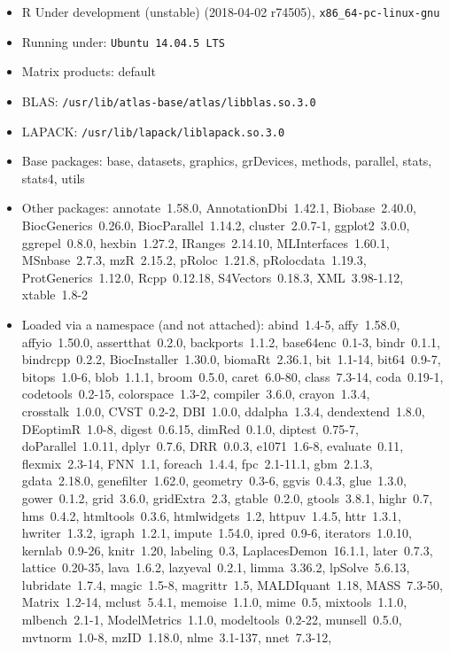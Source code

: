 \documentclass[12pt]{article}\usepackage[]{graphicx}\usepackage[]{color}
\begin{document}
\begin{appendices}
\begin{itemize}\raggedright
  \item R Under development (unstable) (2018-04-02 r74505), \verb|x86_64-pc-linux-gnu|
  \item Running under: \verb|Ubuntu 14.04.5 LTS|
  \item Matrix products: default
  \item BLAS: \verb|/usr/lib/atlas-base/atlas/libblas.so.3.0|
  \item LAPACK: \verb|/usr/lib/lapack/liblapack.so.3.0|
  \item Base packages: base, datasets, graphics, grDevices,
    methods, parallel, stats, stats4, utils
  \item Other packages: annotate~1.58.0, AnnotationDbi~1.42.1,
    Biobase~2.40.0, BiocGenerics~0.26.0, BiocParallel~1.14.2,
    cluster~2.0.7-1, ggplot2~3.0.0, ggrepel~0.8.0, hexbin~1.27.2,
    IRanges~2.14.10, MLInterfaces~1.60.1, MSnbase~2.7.3,
    mzR~2.15.2, pRoloc~1.21.8, pRolocdata~1.19.3,
    ProtGenerics~1.12.0, Rcpp~0.12.18, S4Vectors~0.18.3,
    XML~3.98-1.12, xtable~1.8-2
  \item Loaded via a namespace (and not attached): abind~1.4-5,
    affy~1.58.0, affyio~1.50.0, assertthat~0.2.0, backports~1.1.2,
    base64enc~0.1-3, bindr~0.1.1, bindrcpp~0.2.2,
    BiocInstaller~1.30.0, biomaRt~2.36.1, bit~1.1-14, bit64~0.9-7,
    bitops~1.0-6, blob~1.1.1, broom~0.5.0, caret~6.0-80,
    class~7.3-14, coda~0.19-1, codetools~0.2-15, colorspace~1.3-2,
    compiler~3.6.0, crayon~1.3.4, crosstalk~1.0.0, CVST~0.2-2,
    DBI~1.0.0, ddalpha~1.3.4, dendextend~1.8.0, DEoptimR~1.0-8,
    digest~0.6.15, dimRed~0.1.0, diptest~0.75-7,
    doParallel~1.0.11, dplyr~0.7.6, DRR~0.0.3, e1071~1.6-8,
    evaluate~0.11, flexmix~2.3-14, FNN~1.1, foreach~1.4.4,
    fpc~2.1-11.1, gbm~2.1.3, gdata~2.18.0, genefilter~1.62.0,
    geometry~0.3-6, ggvis~0.4.3, glue~1.3.0, gower~0.1.2,
    grid~3.6.0, gridExtra~2.3, gtable~0.2.0, gtools~3.8.1,
    highr~0.7, hms~0.4.2, htmltools~0.3.6, htmlwidgets~1.2,
    httpuv~1.4.5, httr~1.3.1, hwriter~1.3.2, igraph~1.2.1,
    impute~1.54.0, ipred~0.9-6, iterators~1.0.10, kernlab~0.9-26,
    knitr~1.20, labeling~0.3, LaplacesDemon~16.1.1, later~0.7.3,
    lattice~0.20-35, lava~1.6.2, lazyeval~0.2.1, limma~3.36.2,
    lpSolve~5.6.13, lubridate~1.7.4, magic~1.5-8, magrittr~1.5,
    MALDIquant~1.18, MASS~7.3-50, Matrix~1.2-14, mclust~5.4.1,
    memoise~1.1.0, mime~0.5, mixtools~1.1.0, mlbench~2.1-1,
    ModelMetrics~1.1.0, modeltools~0.2-22, munsell~0.5.0,
    mvtnorm~1.0-8, mzID~1.18.0, nlme~3.1-137, nnet~7.3-12,

\end{itemize}
\end{appendices}
\end{document}
